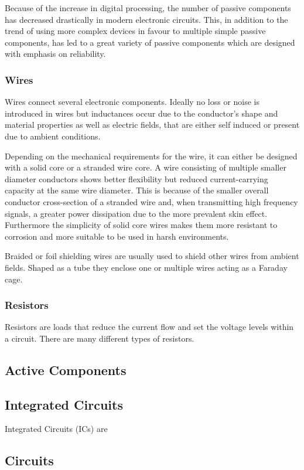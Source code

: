 Because of the increase in digital processing, the number of passive components has decreased drastically in modern electronic circuits. This, in addition to the trend of using more complex devices in favour to multiple simple passive components, has led to a great variety of passive components which are designed with emphasis on reliability.

\subsubsection{Wires}

Wires connect several electronic components. Ideally no loss or noise is introduced in wires but inductances occur due to the conductor's shape and material properties as well as electric fields, that are either self induced or present due to ambient conditions.

Depending on the mechanical requirements for the wire, it can either be designed with a solid core or a stranded wire core. A wire consisting of multiple smaller diameter conductors shows better flexibility but reduced current-carrying capacity at the same wire diameter. This is because of the smaller overall conductor cross-section of a stranded wire and, when transmitting high frequency signals, a greater power dissipation due to the more prevalent skin effect. Furthermore the simplicity of solid core wires makes them more resistant to corrosion and more suitable to be used in harsh environments.

Braided or foil shielding wires are usually used to shield other wires from ambient fields. Shaped as a tube they enclose one or multiple wires acting as a Faraday cage.

\subsubsection{Resistors}

Resistors are loads that reduce the current flow and set the voltage levels within a circuit. There are many different types of resistors.

\subsection{Active Components}

\subsection{Integrated Circuits}

Integrated Circuits (ICs) are 


\subsection{Circuits}